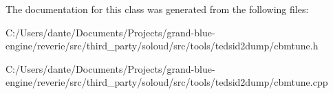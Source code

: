 The documentation for this class was generated from the following files\+:\begin{DoxyCompactItemize}
\item 
C\+:/\+Users/dante/\+Documents/\+Projects/grand-\/blue-\/engine/reverie/src/third\+\_\+party/soloud/src/tools/tedsid2dump/cbmtune.\+h\item 
C\+:/\+Users/dante/\+Documents/\+Projects/grand-\/blue-\/engine/reverie/src/third\+\_\+party/soloud/src/tools/tedsid2dump/cbmtune.\+cpp\end{DoxyCompactItemize}
